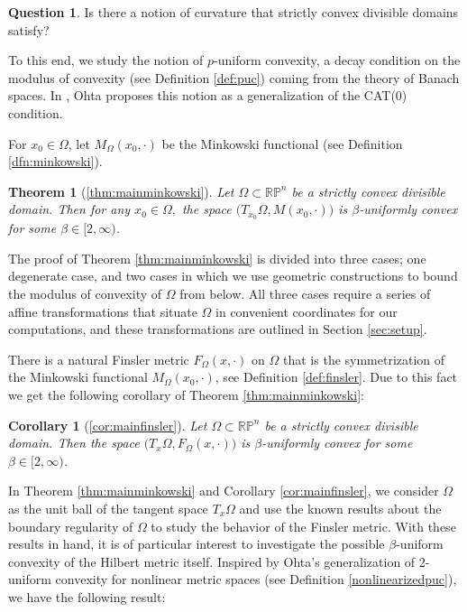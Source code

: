 \documentclass[letterpaper, 11pt, reqno]{amsart}
\newtheorem*{theorem*}{Theorem}
\newtheorem*{corollary*}{Corollary}
\theoremstyle{definition}
\newtheorem{question}[thm]{Question}
\begin{document}
\begin{question}
    Is there a notion of curvature that strictly convex divisible domains satisfy?
\end{question}

To this end, we study the notion of $p $-uniform convexity, a decay condition on the modulus of convexity (see Definition \ref{def:puc}) coming from the theory of Banach spaces. In \cite{Ohta}, Ohta proposes this notion as a generalization of the CAT(0) condition.

For $x_0 \in \Omega$, let $M_\Omega(x_0, \cdot)$ be the Minkowski functional (see Definition \ref{dfn:minkowski}).

\begin{theorem*}[\ref{thm:mainminkowski}]
Let $\Omega \subset \mathbb{RP}^n$ be a strictly convex divisible domain. Then for any $x_0 \in \Omega,$ the space $\big(T_{x_0}\Omega, M(x_0, \cdot)\big)$ is $\beta$-uniformly convex for some $\beta \in [2, \infty)$.
\end{theorem*}

The proof of Theorem \ref{thm:mainminkowski} is divided into three cases; one degenerate case, and two cases in which we use geometric constructions to bound the modulus of convexity of $\Omega$ from below. All three cases require a series of affine transformations that situate $\Omega$ in convenient coordinates for our computations, and these transformations are outlined in Section \ref{sec:setup}.

There is a natural Finsler metric $F_\Omega(x,\cdot)$ on $\Omega$ that is the symmetrization of the Minkowski functional $M_\Omega(x_0, \cdot)$, see Definition \ref{def:finsler}. Due to this fact we get the following corollary of Theorem \ref{thm:mainminkowski}:

\begin{corollary*}[\ref{cor:mainfinsler}]
    Let $\Omega \subset \mathbb{RP}^n$ be a strictly convex divisible domain. Then the space $\big(T_x\Omega, F_\Omega(x, \cdot)\big)$ is $\beta$-uniformly convex for some $\beta \in [2, \infty)$.
\end{corollary*}

In Theorem \ref{thm:mainminkowski} and Corollary \ref{cor:mainfinsler}, we consider $\Omega$ as the unit ball of the tangent space $T_x\Omega$ and use the known results about the boundary regularity of $\Omega$ to study the behavior of the Finsler metric. With these results in hand, it is of particular interest to investigate the possible $\beta$-uniform convexity of the Hilbert metric itself. Inspired by Ohta's generalization of 2-uniform convexity for nonlinear metric spaces (see Definition \ref{nonlinearizedpuc}), we have the following result:
\end{document}
